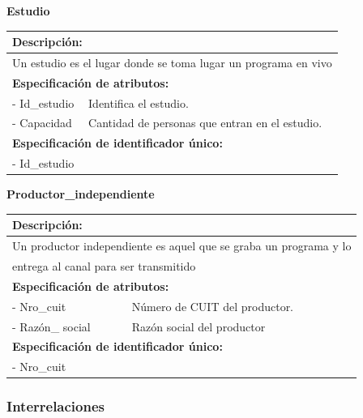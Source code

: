 \documentclass[a4paper,10pt]{article}
\begin{document}
    \begin{flushleft}
      \begin{large} \bf{Estudio} \end{large}
    \end{flushleft}
      \begin{tabular}{| p{2cm} | p{9cm} |}
	\hline
	\multicolumn{2}{|l|}{\bf{Descripci\'on:}} \\
	\hline
	\multicolumn{2}{|l|}{Un estudio es el lugar donde se toma lugar un programa en vivo} \\
	\hline	
	\multicolumn{2}{|l|}{\bf{Especificaci\'on de atributos:}} \\
	\hline
	- Id\_estudio & Identifica el estudio. \\
	\hline \hline
	- Capacidad & Cantidad de personas que entran en el estudio. \\
	\hline
	\multicolumn{2}{|l|}{\bf{Especificaci\'on de identificador \'unico:}} \\
	\hline
	\multicolumn{2}{|l|}{- Id\_estudio} \\
	\hline
      \end{tabular} 
      
    \begin{flushleft}
      \begin{large} \bf{Productor\_independiente} \end{large}
    \end{flushleft}
      \begin{tabular}{| p{2cm} | p{9cm} |}
	\hline
	\multicolumn{2}{|l|}{\bf{Descripci\'on:}} \\
	\hline
	\multicolumn{2}{|l|}{Un productor independiente es aquel que se graba un programa y lo} \\
	\multicolumn{2}{|l|}{entrega al canal para ser transmitido} \\	
	\hline	
	\multicolumn{2}{|l|}{\bf{Especificaci\'on de atributos:}} \\
	\hline
	- Nro\_cuit & N\'umero de CUIT del productor. \\
	\hline \hline
	- Raz\'on\_ \newline social & Raz\'on social del productor\\
	\hline
	\multicolumn{2}{|l|}{\bf{Especificaci\'on de identificador \'unico:}} \\
	\hline
	\multicolumn{2}{|l|}{- Nro\_cuit} \\
	\hline
      \end{tabular} 
   
   
    \subsubsection{Interrelaciones}
    
\end{document}
